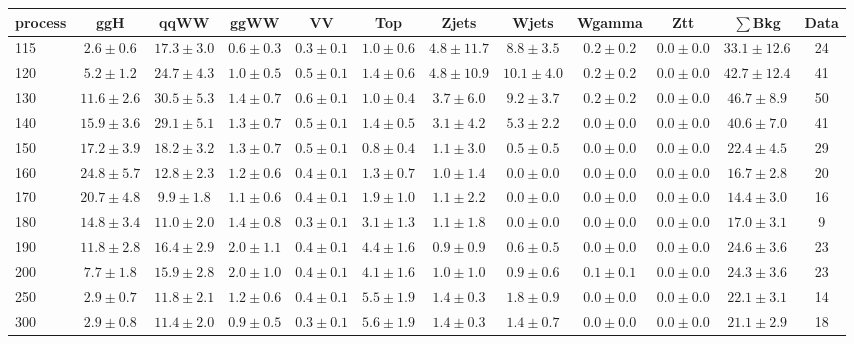 \begin{table}
{\footnotesize
 \begin{center}
 \begin{tabular}{l c c c c c c c c c c c }
 \hline
 process & ggH & qqWW & ggWW & VV & Top & Zjets & Wjets & Wgamma & Ztt & $\sum$Bkg & Data \\
 \hline
115 & $2.6\pm0.6$ & $17.3\pm3.0$ & $0.6\pm0.3$ & $0.3\pm0.1$ & $1.0\pm0.6$ & $4.8\pm11.7$ & $8.8\pm3.5$ & $0.2\pm0.2$ & $0.0\pm0.0$ & $33.1\pm12.6$ & 24 \\
120 & $5.2\pm1.2$ & $24.7\pm4.3$ & $1.0\pm0.5$ & $0.5\pm0.1$ & $1.4\pm0.6$ & $4.8\pm10.9$ & $10.1\pm4.0$ & $0.2\pm0.2$ & $0.0\pm0.0$ & $42.7\pm12.4$ & 41 \\
130 & $11.6\pm2.6$ & $30.5\pm5.3$ & $1.4\pm0.7$ & $0.6\pm0.1$ & $1.0\pm0.4$ & $3.7\pm6.0$ & $9.2\pm3.7$ & $0.2\pm0.2$ & $0.0\pm0.0$ & $46.7\pm8.9$ & 50 \\
140 & $15.9\pm3.6$ & $29.1\pm5.1$ & $1.3\pm0.7$ & $0.5\pm0.1$ & $1.4\pm0.5$ & $3.1\pm4.2$ & $5.3\pm2.2$ & $0.0\pm0.0$ & $0.0\pm0.0$ & $40.6\pm7.0$ & 41 \\
150 & $17.2\pm3.9$ & $18.2\pm3.2$ & $1.3\pm0.7$ & $0.5\pm0.1$ & $0.8\pm0.4$ & $1.1\pm3.0$ & $0.5\pm0.5$ & $0.0\pm0.0$ & $0.0\pm0.0$ & $22.4\pm4.5$ & 29 \\
160 & $24.8\pm5.7$ & $12.8\pm2.3$ & $1.2\pm0.6$ & $0.4\pm0.1$ & $1.3\pm0.7$ & $1.0\pm1.4$ & $0.0\pm0.0$ & $0.0\pm0.0$ & $0.0\pm0.0$ & $16.7\pm2.8$ & 20 \\
170 & $20.7\pm4.8$ & $9.9\pm1.8$ & $1.1\pm0.6$ & $0.4\pm0.1$ & $1.9\pm1.0$ & $1.1\pm2.2$ & $0.0\pm0.0$ & $0.0\pm0.0$ & $0.0\pm0.0$ & $14.4\pm3.0$ & 16 \\
180 & $14.8\pm3.4$ & $11.0\pm2.0$ & $1.4\pm0.8$ & $0.3\pm0.1$ & $3.1\pm1.3$ & $1.1\pm1.8$ & $0.0\pm0.0$ & $0.0\pm0.0$ & $0.0\pm0.0$ & $17.0\pm3.1$ & 9 \\
190 & $11.8\pm2.8$ & $16.4\pm2.9$ & $2.0\pm1.1$ & $0.4\pm0.1$ & $4.4\pm1.6$ & $0.9\pm0.9$ & $0.6\pm0.5$ & $0.0\pm0.0$ & $0.0\pm0.0$ & $24.6\pm3.6$ & 23 \\
200 & $7.7\pm1.8$ & $15.9\pm2.8$ & $2.0\pm1.0$ & $0.4\pm0.1$ & $4.1\pm1.6$ & $1.0\pm1.0$ & $0.9\pm0.6$ & $0.1\pm0.1$ & $0.0\pm0.0$ & $24.3\pm3.6$ & 23 \\
250 & $2.9\pm0.7$ & $11.8\pm2.1$ & $1.2\pm0.6$ & $0.4\pm0.1$ & $5.5\pm1.9$ & $1.4\pm0.3$ & $1.8\pm0.9$ & $0.0\pm0.0$ & $0.0\pm0.0$ & $22.1\pm3.1$ & 14 \\
300 & $2.9\pm0.8$ & $11.4\pm2.0$ & $0.9\pm0.5$ & $0.3\pm0.1$ & $5.6\pm1.9$ & $1.4\pm0.3$ & $1.4\pm0.7$ & $0.0\pm0.0$ & $0.0\pm0.0$ & $21.1\pm2.9$ & 18 \\

\end{tabular}
\end{center}}
\end{table}
